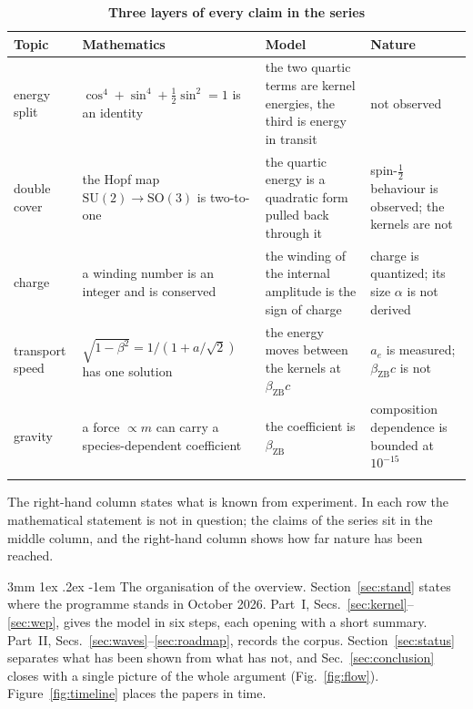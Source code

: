 \documentclass[%
 reprint, amsmath,amssymb, aps, prb, ]{revtex4-2}
\makeatletter
\numberwithin{equation}{section}
\renewcommand\paragraph{%
  \@startsection{paragraph}{4}{\z@}%
    {3mm \@plus 1ex \@minus .2ex}%
    {-1em}%
    {\normalfont\normalsize\itshape}}
\newcommand{\betaZB}{\beta_{\text{ZB}}}
\makeatother
\begin{document}
\begin{table}[t!]
\centering
\caption{\textbf{Three layers of every claim in the series}}
\label{tab:layers}
\renewcommand{\arraystretch}{1.4}
\setlength{\tabcolsep}{7pt}
\begin{tabular}{>{\raggedright\arraybackslash}p{3.0cm}>{\raggedright\arraybackslash}p{4.2cm}>{\raggedright\arraybackslash}p{4.4cm}>{\raggedright\arraybackslash}p{4.3cm}}
\toprule
\textbf{Topic} & \textbf{Mathematics} & \textbf{Model} & \textbf{Nature} \\
\midrule
energy split & $\cos^{4}+\sin^{4}+\tfrac12\sin^{2}=1$ is an identity & the two quartic terms are kernel energies, the third is energy in transit & not observed \\
\addlinespace[0.2cm]
double cover & the Hopf map $\mathrm{SU}(2)\to\mathrm{SO}(3)$ is two-to-one & the quartic energy is a quadratic form pulled back through it & spin-$\tfrac12$ behaviour is observed; the kernels are not \\
\addlinespace[0.2cm]
charge & a winding number is an integer and is conserved & the winding of the internal amplitude is the sign of charge & charge is quantized; its size $\alpha$ is not derived \\
\addlinespace[0.2cm]
transport speed & $\sqrt{1-\beta^{2}} = 1/(1+a/\sqrt2)$ has one solution & the energy moves between the kernels at $\betaZB c$ & $a_e$ is measured; $\betaZB c$ is not \\
\addlinespace[0.2cm]
gravity & a force $\propto m$ can carry a species-dependent coefficient & the coefficient is $\betaZB$ & composition dependence is bounded at $10^{-15}$ \\
\addlinespace[0.2cm]
\bottomrule
\end{tabular}
\vspace{0.2cm}
\begin{minipage}{0.95\textwidth}
\justifying\footnotesize
The right-hand column states what is known from experiment. In each row the mathematical statement is not in question; the claims of the series sit in the middle column, and the right-hand column shows how far nature has been reached.
\end{minipage}
\end{table}

\paragraph{The organisation of the overview.} Section~\ref{sec:stand} states where the programme stands in October 2026. Part~I, Secs.~\ref{sec:kernel}--\ref{sec:wep}, gives the model in six steps, each opening with a short summary. Part~II, Secs.~\ref{sec:waves}--\ref{sec:roadmap}, records the corpus. Section~\ref{sec:status} separates what has been shown from what has not, and Sec.~\ref{sec:conclusion} closes with a single picture of the whole argument (Fig.~\ref{fig:flow}). Figure~\ref{fig:timeline} places the papers in time.
\end{document}
